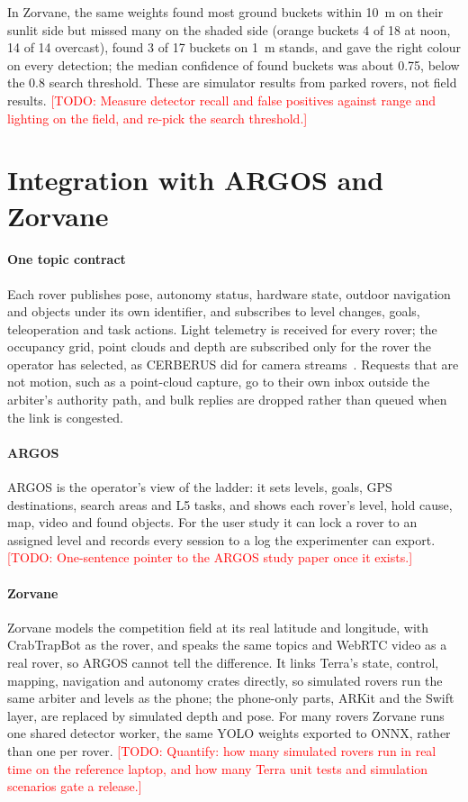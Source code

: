 \documentclass[conference]{IEEEtran}
\newcommand{\todo}[1]{\textcolor{red}{[TODO: #1]}}
\begin{document}
In Zorvane, the same weights found most ground buckets within 10~m on their sunlit side but missed many on the shaded side (orange buckets 4 of 18 at noon, 14 of 14 overcast), found 3 of 17 buckets on 1~m stands, and gave the right colour on every detection; the median confidence of found buckets was about 0.75, below the 0.8 search threshold.
These are simulator results from parked rovers, not field results.
\todo{Measure detector recall and false positives against range and lighting on the field, and re-pick the search threshold.}

\section{Integration with ARGOS and Zorvane}
\label{sec:integration}

\paragraph{One topic contract}
Each rover publishes pose, autonomy status, hardware state, outdoor navigation and objects under its own identifier, and subscribes to level changes, goals, teleoperation and task actions.
Light telemetry is received for every rover; the occupancy grid, point clouds and depth are subscribed only for the rover the operator has selected, as CERBERUS did for camera streams~\cite{tranzatto2022finals}.
Requests that are not motion, such as a point-cloud capture, go to their own inbox outside the arbiter's authority path, and bulk replies are dropped rather than queued when the link is congested.

\paragraph{ARGOS}
ARGOS is the operator's view of the ladder: it sets levels, goals, GPS destinations, search areas and L5 tasks, and shows each rover's level, hold cause, map, video and found objects.
For the user study it can lock a rover to an assigned level and records every session to a log the experimenter can export.
\todo{One-sentence pointer to the ARGOS study paper once it exists.}

\paragraph{Zorvane}
Zorvane models the competition field at its real latitude and longitude, with CrabTrapBot as the rover, and speaks the same topics and WebRTC video as a real rover, so ARGOS cannot tell the difference.
It links Terra's state, control, mapping, navigation and autonomy crates directly, so simulated rovers run the same arbiter and levels as the phone; the phone-only parts, ARKit and the Swift layer, are replaced by simulated depth and pose.
For many rovers Zorvane runs one shared detector worker, the same YOLO weights exported to ONNX, rather than one per rover.
\todo{Quantify: how many simulated rovers run in real time on the reference laptop, and how many Terra unit tests and simulation scenarios gate a release.}
\end{document}
